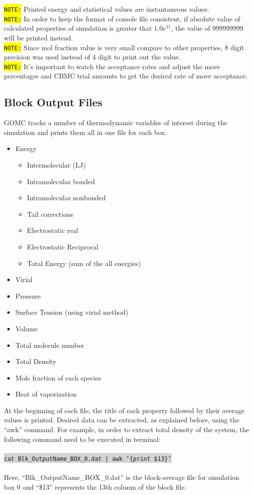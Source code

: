 \colorbox{yellow}{\texttt{NOTE:}} Printed energy and statistical values are instantaneous values.\\
\colorbox{yellow}{\texttt{NOTE:}} In order to keep the format of console file consistent, if absolute value of calculated properties of simulation is greater that $1.0 e^{11}$, the value of 999999999 will be printed instead.\\
\colorbox{yellow}{\texttt{NOTE:}} Since mol fraction value is very small compare to other properties, 8 digit precision was used instead of 4 digit to print out the value.\\
\colorbox{yellow}{\texttt{NOTE:}} It's important to watch the acceptance rates and adjust the move percentages and CBMC trial amounts to get the desired rate of move acceptance.

\subsection{Block Output Files}
GOMC tracks a number of thermodynamic variables of interest during the simulation and prints them all in one file for each box.
\begin{itemize}
\item Energy
	\begin{itemize}
	\item Intermolecular (LJ)
	\item Intramolecular bonded
	\item Intramolecular nonbonded
	\item Tail corrections
	\item Electrostatic real
	\item Electrostatic Reciprocal
	\item Total Energy (sum of the all energies)
	\end{itemize}
\item Virial
\item Pressure 
\item Surface Tension (using virial method)
\item Volume
\item Total molecule number
\item Total Density
\item Mole fraction of each species
\item Heat of vaporization
\end{itemize}
At the beginning of each file, the title of each property followed by their average values is printed. Desired data can be extracted, as explained before, using the ``awk'' command. For example, in order to extract total density of the system, the following command need to be executed in terminal:\\\\
\colorbox{lightgray}{
\texttt{cat Blk\_OutputName\_BOX\_0.dat | awk `\{{print \$13}\}'}
}\\\\
Here, ``Blk\_OutputName\_BOX\_0.dat'' is the block-average file for simulation box 0 and ``\$13'' represents the 13th column of the block file.\\

